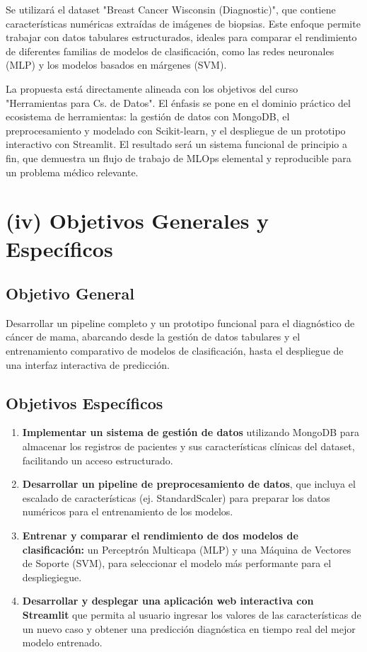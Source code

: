 \documentclass[12pt]{src/formato_utem}
\begin{document}
Se utilizará el dataset "Breast Cancer Wisconsin (Diagnostic)", que contiene características numéricas extraídas de imágenes de biopsias. Este enfoque permite trabajar con datos tabulares estructurados, ideales para comparar el rendimiento de diferentes familias de modelos de clasificación, como las redes neuronales (MLP) y los modelos basados en márgenes (SVM).

La propuesta está directamente alineada con los objetivos del curso "Herramientas para Cs. de Datos". El énfasis se pone en el dominio práctico del ecosistema de herramientas: la gestión de datos con MongoDB, el preprocesamiento y modelado con Scikit-learn, y el despliegue de un prototipo interactivo con Streamlit. El resultado será un sistema funcional de principio a fin, que demuestra un flujo de trabajo de MLOps elemental y reproducible para un problema médico relevante.
\newpage
\section*{(iv) Objetivos Generales y Específicos}
\subsection*{Objetivo General}
Desarrollar un pipeline completo y un prototipo funcional para el diagnóstico de cáncer de mama, abarcando desde la gestión de datos tabulares y el entrenamiento comparativo de modelos de clasificación, hasta el despliegue de una interfaz interactiva de predicción.

\subsection*{Objetivos Específicos}
\begin{enumerate}
    \item \textbf{Implementar un sistema de gestión de datos} utilizando MongoDB para almacenar los registros de pacientes y sus características clínicas del dataset, facilitando un acceso estructurado.
    \item \textbf{Desarrollar un pipeline de preprocesamiento de datos}, que incluya el escalado de características (ej. StandardScaler) para preparar los datos numéricos para el entrenamiento de los modelos.
    \item \textbf{Entrenar y comparar el rendimiento de dos modelos de clasificación:} un Perceptrón Multicapa (MLP) y una Máquina de Vectores de Soporte (SVM), para seleccionar el modelo más performante para el despliegiegue.
    \item \textbf{Desarrollar y desplegar una aplicación web interactiva con Streamlit} que permita al usuario ingresar los valores de las características de un nuevo caso y obtener una predicción diagnóstica en tiempo real del mejor modelo entrenado.
\end{enumerate}
\newpage
\end{document}
